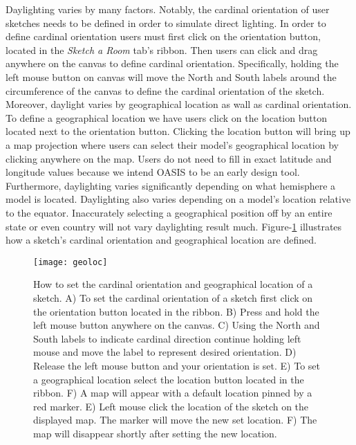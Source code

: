 		Daylighting varies by many factors.
		Notably, the cardinal orientation of user sketches needs to be defined in order to simulate direct lighting.
		In order to define cardinal orientation users must first click on the orientation button, located in the \textit{Sketch a Room} tab's ribbon.
		Then users can click and drag anywhere on the canvas to define cardinal orientation.
		Specifically, holding the left mouse button on canvas will move the North and South labels around the circumference of the canvas to define the cardinal orientation of the sketch.
		Moreover, daylight varies by geographical location as wall as cardinal orientation.
		To define a geographical location we have users click on the location button located next to the orientation button.
		Clicking the location button will bring up a map projection where users can select their model's geographical location by clicking anywhere on the map.
		Users do not need to fill in exact latitude and longitude values because we intend OASIS to be an early design tool. 
		Furthermore, daylighting varies significantly depending on what hemisphere a model is located. Daylighting also varies depending on a model's location relative to the equator.
		Inaccurately selecting a geographical position off by an entire state or even country will not vary daylighting result much.
		Figure-\ref{fig:geoloc} illustrates how a sketch's cardinal orientation and geographical location are defined.

		\begin{figure}[t]
		\centering
		\texttt{[image: geoloc]}
		\caption{How to set the cardinal orientation and geographical location of a sketch.
		A) To set the cardinal orientation of a sketch first click on the orientation button located in the ribbon.
		B) Press and hold the left mouse button anywhere on the canvas.
		C) Using the North and South labels to indicate cardinal direction continue holding left mouse and move the label to represent desired orientation.
		D) Release the left mouse button and your orientation is set.
		E) To set a geographical location select the location button located in the ribbon.
		F) A map will appear with a default location pinned by a red marker.
		E) Left mouse click the location of the sketch on the displayed map. The marker will move  the new set location.
		F) The map will disappear shortly after setting the new location.}
		\label{fig:geoloc}
		\end{figure}

